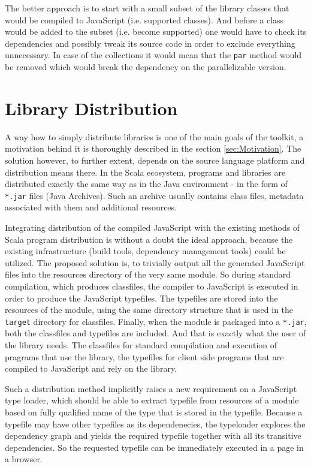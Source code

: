 \documentclass[12pt,a4paper]{report}
\begin{document}
The better approach is to start with a small subset of the library classes that would be compiled to JavaScript (i.e. supported classes). And before a class would be added to the subset (i.e. become supported) one would have to check its dependencies and possibly tweak its source code in order to exclude everything unnecessary. In case of the collections it would mean that the \texttt{par} method would be removed which would break the dependency on the parallelizable version.
 
\section{Library Distribution}

A way how to simply distribute libraries is one of the main goals of the toolkit, a motivation behind it is thoroughly described in the section \ref{sec:Motivation}. The solution however, to further extent, depends on the source language platform and distribution means there. In the Scala ecosystem, programs and libraries are distributed exactly the same way as in the Java environment - in the form of \texttt{*.jar} files (Java Archives). Such an archive usually contains class files, metadata associated with them and additional resources.

Integrating distribution of the compiled JavaScript with the existing methods of Scala program distribution is without a doubt the ideal approach, because the existing infrastructure (build tools, dependency management tools) could be utilized. The proposed solution is, to trivially output all the generated JavaScript files into the resources directory of the very same module. So during standard compilation, which produces classfiles, the compiler to JavaScript is executed in order to produce the JavaScript typefiles. The typefiles are stored into the resources of the module, using the same directory structure that is used in the \texttt{target} directory for classfiles. Finally, when the module is packaged into a \texttt{*.jar}, both the classfiles and typefiles are included. And that is exactly what the user of the library needs. The classfiles for standard compilation and execution of pragrams that use the library, the typefiles for client side programs that are compiled to JavaScript and rely on the library.

Such a distribution method implicitly raises a new requirement on a JavaScript type loader, which should be able to extract typefile from resources of a module based on fully qualified name of the type that is stored in the typefile. Because a typefile may have other typefiles as its dependenecies, the typeloader explores the dependency graph and yields the required typefile together with all its transitive dependencies. So the requested typefile can be immediately executed in a page in a browser.
\end{document}

